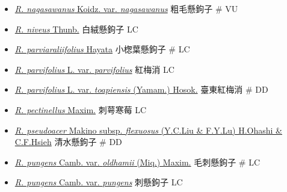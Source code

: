 \begin{itemize}
\begin{itemize}
        \item[] \href{http://www.theplantlist.org/tpl1.1/search?q=Rubus+nagasawanus+var.+nagasawanus}{\textit{R. nagasawanus} Koidz. var. \textit{nagasawanus}}   粗毛懸鉤子  \# VU
        \item[] \href{http://www.theplantlist.org/tpl1.1/search?q=Rubus+niveus}{\textit{R. niveus} Thunb.}   白絨懸鉤子   LC
        \item[] \href{http://www.theplantlist.org/tpl1.1/search?q=Rubus+parviaraliifolius}{\textit{R. parviaraliifolius} Hayata}   小楤葉懸鉤子  \# LC
        \item[] \href{http://www.theplantlist.org/tpl1.1/search?q=Rubus+parvifolius+var.+parvifolius}{\textit{R. parvifolius} L. var. \textit{parvifolius}}   紅梅消   LC
        \item[] \href{http://www.theplantlist.org/tpl1.1/search?q=Rubus+parvifolius+var.+toapiensis}{\textit{R. parvifolius} L. var. \textit{toapiensis} (Yamam.) Hosok.}   臺東紅梅消  \# DD
        \item[] \href{http://www.theplantlist.org/tpl1.1/search?q=Rubus+pectinellus}{\textit{R. pectinellus} Maxim.}   刺萼寒莓   LC
        \item[] \href{http://www.theplantlist.org/tpl1.1/search?q=Rubus+pseudoacer+subsp.+flexuosus}{\textit{R. pseudoacer} Makino subsp. \textit{flexuosus} (Y.C.Liu \& F.Y.Lu) H.Ohashi \& C.F.Hsieh}   清水懸鉤子  \# DD
        \item[] \href{http://www.theplantlist.org/tpl1.1/search?q=Rubus+pungens+var.+oldhamii}{\textit{R. pungens} Camb. var. \textit{oldhamii} (Miq.) Maxim.}   毛刺懸鉤子  \# LC
        \item[] \href{http://www.theplantlist.org/tpl1.1/search?q=Rubus+pungens+var.+pungens}{\textit{R. pungens} Camb. var. \textit{pungens}}   刺懸鉤子   LC

\end{itemize}
\end{itemize}
